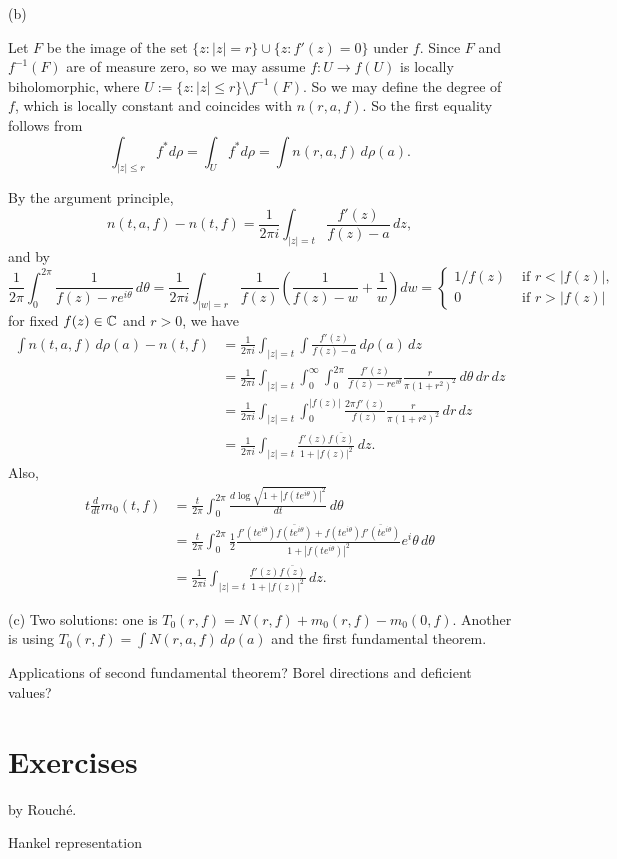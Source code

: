 \documentclass{../../large}
\begin{document}
\begin{pf}
(b)

Let $F$ be the image of the set $\{z:|z|=r\}\cup\{z:f'(z)=0\}$ under $f$.
Since $F$ and $f^{-1}(F)$ are of measure zero, so we may assume $f:U\to f(U)$ is locally biholomorphic, where $U:=\{z:|z|\le r\}\setminus f^{-1}(F)$.
So we may define the degree of $f$, which is locally constant and coincides with $n(r,a,f)$.
So the first equality follows from
\[\int_{|z|\le r}f^*d\rho=\int_Uf^*d\rho=\int n(r,a,f)\,d\rho(a).\]


By the argument principle,
\[n(t,a,f)-n(t,f)=\frac1{2\pi i}\int_{|z|=t}\frac{f'(z)}{f(z)-a}\,dz,\]
and by
\[\frac1{2\pi}\int_0^{2\pi}\frac1{f(z)-re^{i\theta}}\,d\theta=\frac1{2\pi i}\int_{|w|=r}\frac1{f(z)}\left(\frac1{f(z)-w}+\frac1w\right)dw=\begin{cases}
1/f(z)&\text{ if }r<|f(z)|,\\0&\text{ if }r>|f(z)|
\end{cases}\]
for fixed $f(z)\in\mathbb{C}$ and $r>0$, we have
\begin{align*}
\int n(t,a,f)\,d\rho(a)-n(t,f)
&=\frac1{2\pi i}\int_{|z|=t}\int\frac{f'(z)}{f(z)-a}\,d\rho(a)\,dz\\
&=\frac1{2\pi i}\int_{|z|=t}\int_0^\infty\int_0^{2\pi}\frac{f'(z)}{f(z)-re^{i\theta}}\frac r{\pi(1+r^2)^2}\,d\theta\,dr\,dz\\
&=\frac1{2\pi i}\int_{|z|=t}\int_0^{|f(z)|}\frac{2\pi f'(z)}{f(z)}\frac r{\pi(1+r^2)^2}\,dr\,dz\\
&=\frac1{2\pi i}\int_{|z|=t}\frac{f'(z)\bar{f(z)}}{1+|f(z)|^2}\,dz.
\end{align*}
Also,
\begin{align*}
t\frac d{dt}m_0(t,f)
&=\frac t{2\pi}\int_0^{2\pi}\frac{d
\log\sqrt{1+|f(te^{i\theta})|^2}}{dt}\,d\theta\\
&=\frac t{2\pi}\int_0^{2\pi}\frac12\frac{f'(te^{i\theta})\bar{f(te^{i\theta})}+f(te^{i\theta})\bar{f'(te^{i\theta})}}{1+|f(te^{i\theta})|^2}e^i\theta\,d\theta\\
&=\frac1{2\pi i}\int_{|z|=t}\frac{f'(z)\bar{f(z)}}{1+|f(z)|^2}\,dz.
\end{align*}


(c)
Two solutions: one is $T_0(r,f)=N(r,f)+m_0(r,f)-m_0(0,f)$.
Another is using $T_0(r,f)=\int N(r,a,f)\,d\rho(a)$ and the first fundamental theorem.
\end{pf}

Applications of second fundamental theorem?
Borel directions and deficient values?

\section*{Exercises}
\begin{prb}
by Rouch\'e.
\end{prb}
\begin{prb}
\end{prb}
\begin{prb}
Hankel representation
\end{prb}
\begin{prb}
\end{prb}
\end{document}
